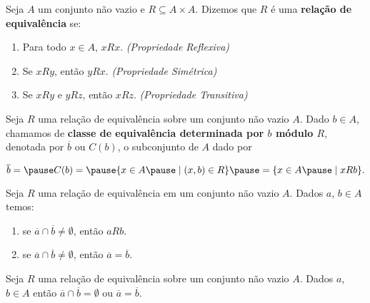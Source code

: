\documentclass{beamer}
\begin{document}
    \begin{frame}
        \begin{definicao}
            Seja $A$ um conjunto não vazio \pause e $R\subseteq A \times A$. \pause Dizemos que $R$ é uma \textbf{relação de equivalência} se:\pause
            \begin{enumerate}[label={\roman*})]
                \item Para todo $x \in A$, $xRx$. \textit{(Propriedade Reflexiva)}\pause\vspace{.2cm}

                \item Se $xRy$, então $yRx$. \textit{(Propriedade Simétrica)}\pause\vspace{.2cm}

                \item Se $xRy$ e $yRz$, então $xRz$. \textit{(Propriedade Transitiva)}
            \end{enumerate}
        \end{definicao}
    \end{frame}

    \begin{frame}
        \begin{definicao}
            Seja $R$ uma relação de equivalência sobre um conjunto não vazio $A$. \pause Dado $b \in A$, \pause chamamos de \textbf{classe de equivalência \pause determinada por $b$ \pause módulo $R$}\pause, denotada por $\overline{b}$ \pause ou $C(b)$, \pause o subconjunto de $A$ \pause dado por\pause
            \begin{center}
                $\overline{b} =\pause C(b) = \pause \{x \in A \pause \mid (x, b) \in R\}\pause = \{x \in A \pause\mid xRb\}.$
            \end{center}
        \end{definicao}
    \end{frame}

    \begin{frame}
        \begin{proposicao}
            Seja $R$ uma relação de equivalência \pause em um conjunto não vazio $A$. \pause Dados $a$, $b \in A$ temos:\pause
            \begin{enumerate}[label={\roman*})]
                \item se $\overline{a} \cap \overline{b} \ne \emptyset$, \pause então $aRb$.\pause \vspace{.3cm}
                \item se  $\overline{a} \cap \overline{b} \neq \emptyset$, \pause então $\overline{a} = \overline{b}$.\pause
            \end{enumerate}
        \end{proposicao}

        \begin{corolario}
            Seja $R$ uma relação de equivalência sobre um conjunto não vazio $A$. \pause Dados $a$, $b \in A$ \pause então $\overline{a} \cap \overline{b} = \emptyset$ \pause ou $\overline{a} = \overline{b}$.
        \end{corolario}
    \end{frame}
\end{document}
